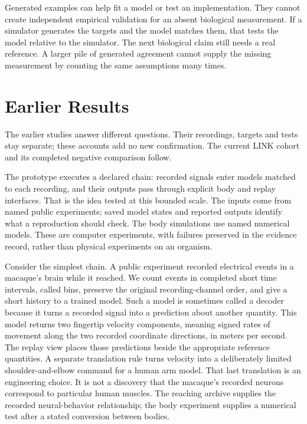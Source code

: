Generated examples can help fit a model or test an implementation. They cannot
create independent empirical validation for an absent biological measurement.
If a simulator generates the targets and the model matches them, that tests the
model relative to the simulator. The next biological claim still needs a real
reference. A larger pile of generated agreement cannot supply the missing
measurement by counting the same assumptions many times.


\section{Earlier Results}

The earlier studies answer different questions. Their recordings, targets and tests
stay separate; these accounts add no new confirmation. The current LINK cohort
and its completed negative comparison follow.

The prototype executes a declared chain: recorded signals enter models matched to each recording, and their outputs pass through explicit body and replay interfaces. That is the idea tested at this bounded scale. The inputs come from named public experiments; saved model states and reported outputs identify what a reproduction should check. The body simulations use named numerical models. These are computer experiments, with failures preserved in the evidence record, rather than physical experiments on an organism.

Consider the simplest chain. A public experiment recorded electrical events in a macaque's brain while it reached. We count events in completed short time intervals, called bins, preserve the original recording-channel order, and give a short history to a trained model. Such a model is sometimes called a decoder because it turns a recorded signal into a prediction about another quantity. This model returns two fingertip velocity components, meaning signed rates of movement along the two recorded coordinate directions, in meters per second. The replay view places those predictions beside the appropriate reference quantities. A separate translation rule turns velocity into a deliberately limited shoulder-and-elbow command for a human arm model. That last translation is an engineering choice. It is not a discovery that the macaque's recorded neurons correspond to particular human muscles. The reaching archive supplies the recorded neural-behavior relationship; the body experiment supplies a numerical test after a stated conversion between bodies.\cite{odoherty2020,nlb2021,myosuite2022,myosim2026}

